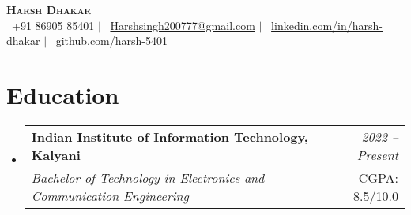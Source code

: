 \documentclass[a4paper,11pt]{article}
\makeatletter
\newcommand{\resumeSubheading}[4]{
\vspace{-1mm}\item
    \begin{tabular*}{0.98\textwidth}[t]{l@{\extracolsep{\fill}}r}
        \textbf{#1} & \textit{\footnotesize{#4}} \\
        \textit{\footnotesize{#3}} &  \footnotesize{#2}\\
    \end{tabular*}
    \vspace{-3mm}
}
\newcommand{\resumeSubHeadingListStart}{\begin{itemize}[leftmargin=*,labelsep=0mm]}
\newcommand{\resumeSubHeadingListEnd}{\end{itemize}\vspace{0mm}}
\makeatother
\begin{document}
\selectfont

\begin{center}
    \textbf{\Huge \scshape Harsh Dhakar} \\ \vspace{1pt}
    \small
    \Mobilefone~+91 86905 85401 $|$ 
    \Letter~\href{mailto:Harshsingh200777@gmail.com}{Harshsingh200777@gmail.com} $|$ 
    \Linkedin~\href{https://linkedin.com/in/harsh-dhakar-fullstack}{linkedin.com/in/harsh-dhakar} $|$
    \Github~\href{https://github.com/harsh-5401}{github.com/harsh-5401}
\end{center}



\section{Education}
  \resumeSubHeadingListStart
    \resumeSubheading
      {Indian Institute of Information Technology, Kalyani}{CGPA: 8.5/10.0}
      {Bachelor of Technology in Electronics and Communication Engineering}{2022 -- Present}
  \resumeSubHeadingListEnd
\vspace{-1mm}
\end{document}
